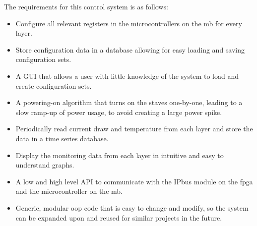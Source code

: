 \documentclass[main.tex]{subfiles}
\begin{document}
The requirements for this control system is as follows:

\begin{itemize}
    \item Configure all relevant registers in the microcontrollers on the \gls{mb} for every layer.
    \item Store configuration data in a database allowing for easy loading and saving configuration sets.
    \item A GUI that allows a user with little knowledge of the system to load and create configuration sets.
    \item A powering-on algorithm that turns on the staves one-by-one, leading to a slow ramp-up of power usage, to avoid creating a large power spike.
    \item Periodically read current draw and temperature from each layer and store the data in a time series database.
    \item Display the monitoring data from each layer in intuitive and easy to understand graphs.
    \item A low and high level API to communicate with the IPbus module on the \acrshort{fpga} and the microcontroller on the \gls{mb}.
    \item Generic, modular \acrshort{oop} code that is easy to change and modify, so the system can be expanded upon and reused for similar projects in the future.
    
\end{itemize}
\end{document}
